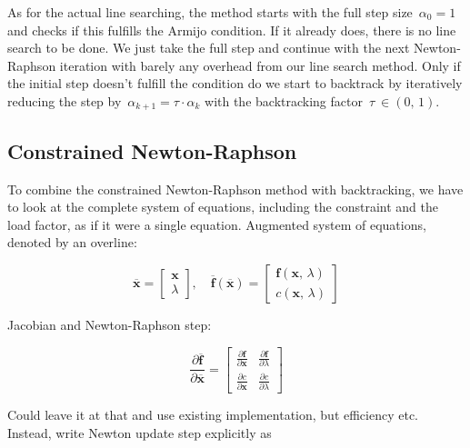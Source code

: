 As for the actual line searching, the method starts with the full step size~$\alpha_{0} = 1$ and checks if this fulfills the Armijo condition.
If it already does, there is no line search to be done.
We just take the full step and continue with the next Newton-Raphson iteration with barely any overhead from our line search method.
Only if the initial step doesn't fulfill the condition do we start to backtrack by iteratively reducing the step by~$\alpha_{k+1} = \tau \cdot \alpha_{k}$ with the backtracking factor~$\tau\ \in (0,\,1)$.

\subsection*{Constrained Newton-Raphson}

To combine the constrained Newton-Raphson method with backtracking, we have to look at the complete system of equations, including the constraint and the load factor, as if it were a single equation.
Augmented system of equations, denoted by an overline:

\begin{equation}
\overline{\boldsymbol{x}} =
\begin{bmatrix}
\boldsymbol{x} \\
\lambda
\end{bmatrix},\quad
\overline{\boldsymbol{f}}(\overline{\boldsymbol{x}}) =
\begin{bmatrix}
\boldsymbol{f}(\boldsymbol{x},\,\lambda) \\
c(\boldsymbol{x},\,\lambda)
\end{bmatrix}
\end{equation}

Jacobian and Newton-Raphson step:

\begin{equation}
\renewcommand{\arraystretch}{1.5}
\frac{\partial\overline{\boldsymbol{f}}}{\partial\overline{\boldsymbol{x}}} =
\begin{bmatrix}
\frac{\partial\boldsymbol{f}}{\partial\boldsymbol{x}} & \frac{\partial\boldsymbol{f}}{\partial\lambda} \\
\frac{\partial c}{\partial \boldsymbol{x}} &  \frac{\partial c}{\partial \lambda}
\end{bmatrix}
\end{equation}

Could leave it at that and use existing implementation, but efficiency etc.
Instead, write Newton update step explicitly as


